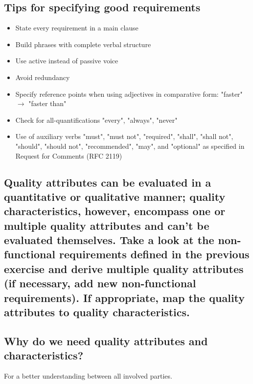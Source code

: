 \documentclass{article}
\begin{document}
\subsection{Tips for specifying good requirements}
\begin{itemize}
    \item State every requirement in a main clause
    \item Build phrases with complete verbal structure
    \item Use active instead of passive voice
    \item Avoid redundancy
    \item Specify reference points when using adjectives in comparative form: "faster" \(\rightarrow\) "faster than"
    \item Check for all-quantifications "every", "always", "never"
    \item Use of auxiliary verbs "must", "must not", "required", "shall", "shall not", "should", "should not", "recommended", "may", and "optional" as specified in Request for Comments (RFC 2119)
\end{itemize}

\subsection{Quality attributes can be evaluated in a quantitative or qualitative manner; quality characteristics, however, encompass one or multiple quality attributes and can't be evaluated themselves. Take a look at the non-functional requirements defined in the previous exercise and derive multiple quality attributes (if necessary, add new non-functional requirements). If appropriate, map the quality attributes to quality characteristics.}

\subsection{Why do we need quality attributes and characteristics?}
For a better understanding between all involved parties.
\end{document}
